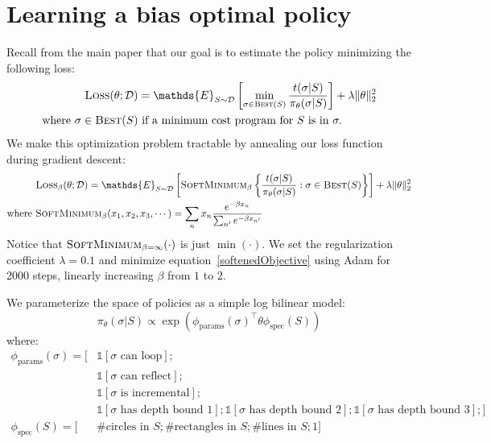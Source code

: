 \documentclass{article}
\newcommand{\indicator}{\mathds{1}} %
\newcommand{\expect}{\mathds{E}} %
\begin{document}
\section{Learning a bias optimal policy}
Recall from the main paper that our goal is to estimate the policy minimizing the following loss:
\begin{align}
\textsc{Loss}(\theta ; \mathcal{D})& =  \expect_{S\sim\mathcal{D}}\left[ \min_{\sigma\in \text{\textsc{Best}}(S)}\frac{t(\sigma | S)}{\pi_\theta (\sigma | S)}\right] + \lambda \Vert\theta\Vert_2^2\label{policyLoss}\\
\text{where }  \sigma \in\text{\textsc{Best}}(S) &\text{ if  a minimum cost program for }S \text{ is in }\sigma .\nonumber %
\end{align}
We make this optimization problem tractable by annealing our loss function during gradient descent:
\begin{align}
&  \textsc{Loss}_\beta(\theta ; \mathcal{D}) =  \expect_{S\sim\mathcal{D}}\left[ \textsc{SoftMinimum}_\beta \left\{
    \frac{t(\sigma | S)}{\pi_\theta (\sigma | S)}    : \sigma\in \text{\textsc{Best}}(S)\right\}\right] + \lambda \Vert\theta\Vert_2^2\label{softenedObjective}\\
  \text{where }&\textsc{SoftMinimum}_\beta (x_1,x_2,x_3,\cdots ) = \sum_n x_n  \frac{e^{-\beta x_n}}{\sum_{n'}e^{-\beta x_{n'}}}
\end{align}
Notice that $\textsc{SoftMinimum}_{\beta = \infty}(\cdot )$ is just $\min(\cdot )$.
We set the regularization coefficient $\lambda = 0.1$ and minimize equation~\ref{softenedObjective}
using Adam for 2000 steps, linearly increasing $\beta$ from $1$ to $2$.

We parameterize the space of policies as a simple log bilinear model:
\begin{equation}
  \pi_{\theta}(\sigma |S)\propto \exp \left( \phi_{\text{params}}(\sigma )^\top\theta \phi_{\text{spec}}(S)\right)
\end{equation}
where:
\begin{align*}
  \phi_{\text{params}}(\sigma ) = [&\indicator [\sigma \text{ can loop}] ;\\
    &\indicator [\sigma \text{ can reflect}];\\
    &\indicator [\sigma \text{ is incremental}] ; \\
    &\indicator [\sigma \text{ has depth bound }1];\indicator [\sigma \text{ has depth bound }2];\indicator [\sigma \text{ has depth bound }3];]\\
  \phi_{\text{spec}}(S) = [&\text{\# circles in }S;\text{\# rectangles in }S;\text{\# lines in }S;1]
  \end{align*}
\end{document}
